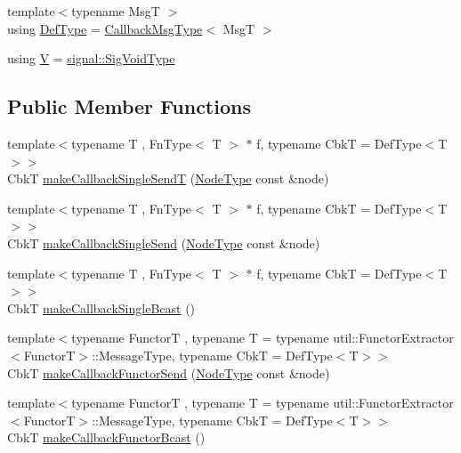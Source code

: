 \begin{DoxyCompactItemize}
\item 
{\footnotesize template$<$typename MsgT $>$ }\\using \hyperlink{structvt_1_1pipe_1_1_pipe_manager_t_l_a5f78dde989930cf645a8bd67301740a7}{Def\+Type} = \hyperlink{structvt_1_1pipe_1_1_pipe_manager_t_l_af6fc2c17f1729fa06450441b0ee81cb1}{Callback\+Msg\+Type}$<$ MsgT $>$
\item 
using \hyperlink{structvt_1_1pipe_1_1_pipe_manager_t_l_a8d394521df58abfd90c1d81c998f22e3}{V} = \hyperlink{namespacevt_1_1pipe_1_1signal_acbe257d1ae44f20fa9fd9b6ed3057caf}{signal\+::\+Sig\+Void\+Type}
\end{DoxyCompactItemize}
\subsection*{Public Member Functions}
\begin{DoxyCompactItemize}
\item 
{\footnotesize template$<$typename T , Fn\+Type$<$ T $>$ $\ast$ f, typename CbkT  = Def\+Type$<$\+T$>$$>$ }\\CbkT \hyperlink{structvt_1_1pipe_1_1_pipe_manager_t_l_aff917693da92fdfb5b275c7cf61e5e8b}{make\+Callback\+Single\+SendT} (\hyperlink{namespacevt_a866da9d0efc19c0a1ce79e9e492f47e2}{Node\+Type} const \&node)
\item 
{\footnotesize template$<$typename T , Fn\+Type$<$ T $>$ $\ast$ f, typename CbkT  = Def\+Type$<$\+T$>$$>$ }\\CbkT \hyperlink{structvt_1_1pipe_1_1_pipe_manager_t_l_a8776a3e14cce177c3b31aed347177750}{make\+Callback\+Single\+Send} (\hyperlink{namespacevt_a866da9d0efc19c0a1ce79e9e492f47e2}{Node\+Type} const \&node)
\item 
{\footnotesize template$<$typename T , Fn\+Type$<$ T $>$ $\ast$ f, typename CbkT  = Def\+Type$<$\+T$>$$>$ }\\CbkT \hyperlink{structvt_1_1pipe_1_1_pipe_manager_t_l_a756fde11660cadf687a73aecccf2ecaa}{make\+Callback\+Single\+Bcast} ()
\item 
{\footnotesize template$<$typename FunctorT , typename T  = typename util\+::\+Functor\+Extractor$<$\+Functor\+T$>$\+::\+Message\+Type, typename CbkT  = Def\+Type$<$\+T$>$$>$ }\\CbkT \hyperlink{structvt_1_1pipe_1_1_pipe_manager_t_l_a446f98d0a74d66539a411e1d41caa505}{make\+Callback\+Functor\+Send} (\hyperlink{namespacevt_a866da9d0efc19c0a1ce79e9e492f47e2}{Node\+Type} const \&node)
\item 
{\footnotesize template$<$typename FunctorT , typename T  = typename util\+::\+Functor\+Extractor$<$\+Functor\+T$>$\+::\+Message\+Type, typename CbkT  = Def\+Type$<$\+T$>$$>$ }\\CbkT \hyperlink{structvt_1_1pipe_1_1_pipe_manager_t_l_a942c7bacba09faa418dd55dfa11e1520}{make\+Callback\+Functor\+Bcast} ()

\end{DoxyCompactItemize}
